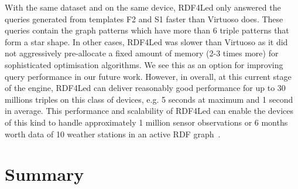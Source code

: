 \vspace{-1.5mm}
With the same dataset and on the same device, RDF4Led only answered the queries generated from templates F2 and S1 faster than Virtuoso does. These queries contain the graph patterns which have more than 6 triple patterns that form a star shape. In other cases, RDF4Led was slower than Virtuoso as it did not aggressively pre-allocate a fixed amount of memory (2-3 times more) for sophisticated optimisation algorithms. We see this as an option for improving query performance in our future work. However, in overall, at this current stage of the engine, RDF4Led can deliver reasonably good performance for up to 30 millions triples on this class of devices, e.g.  5 seconds at maximum and 1 second in average. This performance and scalability of RDF4Led can enable the devices of this kind to handle approximately 1 million sensor observations or 6 months worth data of 10 weather stations in an active RDF graph~\cite{Atemezing:2012}.   

\section{Summary}
